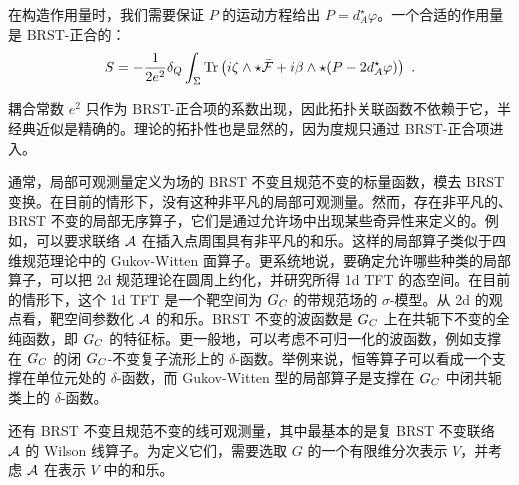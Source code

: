 在构造作用量时，我们需要保证 $P$ 的运动方程给出 $P=d_A^{\star}\varphi$。一个合适的作用量是 BRST-正合的：
\[ S = -\frac{1}{2e^2}\delta_Q\int_\Sigma\operatorname{Tr}\left(i\zeta\wedge\star\bar{\mathcal{F}} + i\beta\wedge\star(P-2d_A^{\star}\varphi)\right) \ . \]


耦合常数 $e^2$ 只作为 BRST-正合项的系数出现，因此拓扑关联函数不依赖于它，半经典近似是精确的。理论的拓扑性也是显然的，因为度规只通过 BRST-正合项进入。


通常，局部可观测量定义为场的 BRST 不变且规范不变的标量函数，模去 BRST 变换。在目前的情形下，没有这种非平凡的局部可观测量。然而，存在非平凡的、BRST 不变的局部无序算子，它们是通过允许场中出现某些奇异性来定义的。例如，可以要求联络 $\mathcal{A}$ 在插入点周围具有非平凡的和乐。这样的局部算子类似于四维规范理论中的 Gukov-Witten 面算子。更系统地说，要确定允许哪些种类的局部算子，可以把 2d 规范理论在圆周上约化，并研究所得 1d TFT 的态空间。在目前的情形下，这个 1d TFT 是一个靶空间为 $G_C$ 的带规范场的 $\sigma$-模型。从 2d 的观点看，靶空间参数化 $\mathcal{A}$ 的和乐。BRST 不变的波函数是 $G_C$ 上在共轭下不变的全纯函数，即 $G_C$ 的特征标。更一般地，可以考虑不可归一化的波函数，例如支撑在 $G_C$ 的闭 $G_C$-不变复子流形上的 $\delta$-函数。举例来说，恒等算子可以看成一个支撑在单位元处的 $\delta$-函数，而 Gukov-Witten 型的局部算子是支撑在 $G_C$ 中闭共轭类上的 $\delta$-函数。


还有 BRST 不变且规范不变的线可观测量，其中最基本的是复 BRST 不变联络 $\mathcal{A}$ 的 Wilson 线算子。为定义它们，需要选取 $G$ 的一个有限维分次表示 $V$，并考虑 $\mathcal{A}$ 在表示 $V$ 中的和乐。

